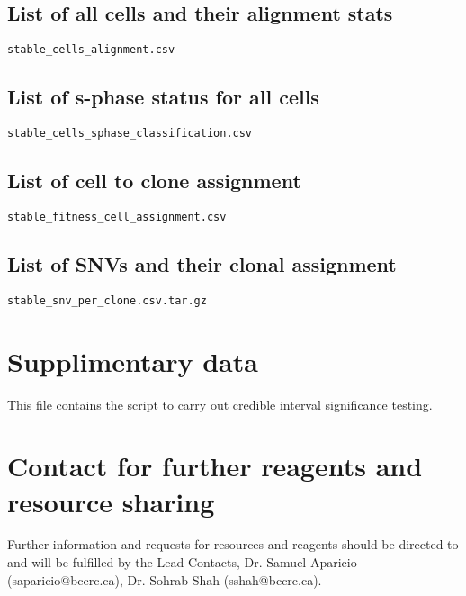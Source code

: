 \documentclass{article}
\makeatletter
\newcommand{\putFigLargCap}[5]
{
\begin{center}
\texttt{[image: \#1]}   
\bigskip
\setbox0\vbox{
\let\caption@rule\relax
\captionof{figure}[#5]{\textbf{#5} #3 \label{#4}}
\global\skip1\lastskip\unskip
\global\setbox1\lastbox

}
\unvbox0
\setbox0\hbox{\unhbox1\unskip\unskip\unpenalty
\global\setbox1\lastbox}
\unvbox1
\vskip\skip1
\end{center}
}
\makeatother
\begin{document}
\subsection{List of all cells and their alignment stats}
\texttt{stable\_cells\_alignment.csv}
\subsection{List of s-phase status for all cells} \texttt{stable\_cells\_sphase\_classification.csv} 
\subsection{List of cell to clone assignment} \texttt{stable\_fitness\_cell\_assignment.csv}
\subsection{List of SNVs and their clonal assignment} \texttt{stable\_snv\_per\_clone.csv.tar.gz}

\section{Supplimentary data}
This file contains the script to carry out credible interval   significance testing.

\section{Contact for further reagents and resource sharing}
Further information and requests for resources and reagents should be directed to and will be fulfilled by the Lead Contacts,
Dr. Samuel Aparicio (saparicio@bccrc.ca), Dr. Sohrab Shah (sshah@bccrc.ca).


 



\begin{comment}


\putFigLargCap{figures/supp/modelcomparisonK4.pdf}{1}
{write the description or details of the figure
}{fig:simulation}{Simulations}



\end{comment}

\end{document}
